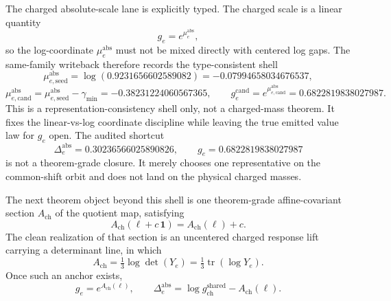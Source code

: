 \documentclass[11pt]{article}
\begin{document}
The charged absolute-scale
lane is explicitly typed. The charged scale is a linear quantity
\[
g_e = e^{\mu_e^{\mathrm{abs}}},
\]
so the log-coordinate \(\mu_e^{\mathrm{abs}}\) must not be mixed directly with centered log gaps.
The same-family writeback therefore records the type-consistent shell
\[
\mu_{e,\mathrm{seed}}^{\mathrm{abs}} = \log(0.9231656602589082) = -0.07994658034676537,
\]
\[
\mu_{e,\mathrm{cand}}^{\mathrm{abs}}
=
\mu_{e,\mathrm{seed}}^{\mathrm{abs}}-\gamma_{\min}
=
-0.38231224060567365,
\qquad
g_e^{\mathrm{cand}} = e^{\mu_{e,\mathrm{cand}}^{\mathrm{abs}}}=0.6822819838027987.
\]
This is a representation-consistency shell only, not a charged-mass theorem. It fixes the
linear-vs-log coordinate discipline while leaving the true emitted value law for \(g_e\) open.
The audited shortcut
\[
\Delta_e^{\mathrm{abs}}=0.30236566025890826,
\qquad
g_e=0.6822819838027987
\]
is not a theorem-grade closure. It merely chooses one representative on the common-shift orbit and
does not land on the physical charged masses.

The next theorem object beyond this shell is one
theorem-grade affine-covariant section \(A_{\mathrm{ch}}\) of the quotient map, satisfying
\[
A_{\mathrm{ch}}(\ell + c\,\mathbf 1)=A_{\mathrm{ch}}(\ell)+c.
\]
The clean realization of that section is an uncentered charged response lift carrying a
determinant line, in which
\[
A_{\mathrm{ch}}=\tfrac13 \log \det(Y_e)=\tfrac13 \operatorname{tr}(\log Y_e).
\]
Once such an anchor exists,
\[
g_e = e^{A_{\mathrm{ch}}(\ell)},
\qquad
\Delta_e^{\mathrm{abs}} = \log g_{\mathrm{ch}}^{\mathrm{shared}} - A_{\mathrm{ch}}(\ell).
\]
\end{document}

